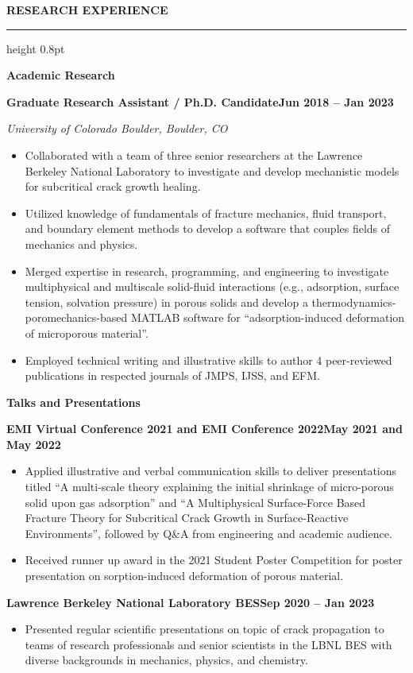 \documentclass[10pt, letterpaper]{article}
\newcommand{\rsection}[1]{%
  \vspace{8pt}%
  {\large\bfseries\MakeUppercase{#1}}%
  \vspace{1pt}%
  \hrule height 0.8pt%
  \vspace{4pt}%
}
\newcommand{\jobline}[2]{%
  \vspace{5pt}%
  \noindent\textbf{#1}\hfill\textbf{#2}\par%
  \vspace{1pt}%
}
\newcommand{\subline}[1]{%
  \vspace{-1pt}%
  \noindent\textit{#1}\par%
  \vspace{1pt}%
}
\newenvironment{rlist}{%
  \begin{itemize}[leftmargin=1.4em, itemsep=1pt, topsep=2pt, parsep=0pt]%
}{%
  \end{itemize}%
}
\begin{document}
\rsection{Research Experience}

\noindent\textbf{Academic Research}

\jobline{Graduate Research Assistant / Ph.D. Candidate}{Jun 2018 -- Jan 2023}
\subline{University of Colorado Boulder, Boulder, CO}
\begin{rlist}
  \item Collaborated with a team of three senior researchers at the Lawrence Berkeley National Laboratory to investigate and develop mechanistic models for subcritical crack growth healing.
  \item Utilized knowledge of fundamentals of fracture mechanics, fluid transport, and boundary element methods to develop a software that couples fields of mechanics and physics.
  \item Merged expertise in research, programming, and engineering to investigate multiphysical and multiscale solid-fluid interactions (e.g., adsorption, surface tension, solvation pressure) in porous solids and develop a thermodynamics-poromechanics-based MATLAB software for ``adsorption-induced deformation of microporous material''.
  \item Employed technical writing and illustrative skills to author 4 peer-reviewed publications in respected journals of JMPS, IJSS, and EFM.
\end{rlist}

\vspace{4pt}
\noindent\textbf{Talks and Presentations}

\jobline{EMI Virtual Conference 2021 and EMI Conference 2022}{May 2021 and May 2022}
\begin{rlist}
  \item Applied illustrative and verbal communication skills to deliver presentations titled ``A multi-scale theory explaining the initial shrinkage of micro-porous solid upon gas adsorption'' and ``A Multiphysical Surface-Force Based Fracture Theory for Subcritical Crack Growth in Surface-Reactive Environments'', followed by Q\&A from engineering and academic audience.
  \item Received runner up award in the 2021 Student Poster Competition for poster presentation on sorption-induced deformation of porous material.
\end{rlist}

\jobline{Lawrence Berkeley National Laboratory BES}{Sep 2020 -- Jan 2023}
\begin{rlist}
  \item Presented regular scientific presentations on topic of crack propagation to teams of research professionals and senior scientists in the LBNL BES with diverse backgrounds in mechanics, physics, and chemistry.
\end{rlist}
\end{document}
